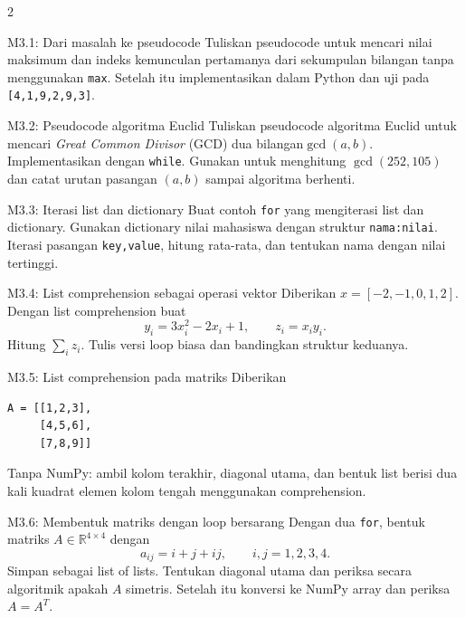 \documentclass[9pt,a4paper]{article}
\begin{document}
\begin{multicols}{2}
\begin{qbox}[L1]{M3.1: Dari masalah ke pseudocode}
Tuliskan pseudocode untuk mencari nilai maksimum dan indeks kemunculan pertamanya dari sekumpulan bilangan tanpa menggunakan \texttt{max}. Setelah itu implementasikan dalam Python dan uji pada \texttt{[4,1,9,2,9,3]}.
\end{qbox}

\begin{qbox}[L2]{M3.2: Pseudocode algoritma Euclid}
Tuliskan pseudocode algoritma Euclid untuk mencari \textit{Great Common Divisor} (GCD) dua bilangan$\gcd(a,b)$. Implementasikan dengan \texttt{while}. Gunakan untuk menghitung $\gcd(252,105)$ dan catat urutan pasangan $(a,b)$ sampai algoritma berhenti.
\end{qbox}

\begin{qbox}[L2]{M3.3: Iterasi list dan dictionary}
Buat contoh \texttt{for} yang mengiterasi list dan dictionary. Gunakan dictionary nilai mahasiswa dengan struktur \texttt{nama:nilai}. Iterasi pasangan \texttt{key,value}, hitung rata-rata, dan tentukan nama dengan nilai tertinggi.
\end{qbox}

\begin{qbox}[L2]{M3.4: List comprehension sebagai operasi vektor}
Diberikan $x=[-2,-1,0,1,2]$. Dengan list comprehension buat
\[
y_i=3x_i^2-2x_i+1,\qquad z_i=x_i y_i.
\]
Hitung $\sum_i z_i$. Tulis versi loop biasa dan bandingkan struktur keduanya.
\end{qbox}

\begin{qbox}[L3]{M3.5: List comprehension pada matriks}
Diberikan
\begin{lstlisting}
A = [[1,2,3],
     [4,5,6],
     [7,8,9]]
\end{lstlisting}
Tanpa NumPy: ambil kolom terakhir, diagonal utama, dan bentuk list berisi dua kali kuadrat elemen kolom tengah menggunakan comprehension.
\end{qbox}

\begin{qbox}[L3]{M3.6: Membentuk matriks dengan loop bersarang}
Dengan dua \texttt{for}, bentuk matriks $A\in\mathbb{R}^{4\times4}$ dengan
\[
a_{ij}=i+j+ij,\qquad i,j=1,2,3,4.
\]
Simpan sebagai list of lists. Tentukan diagonal utama dan periksa secara algoritmik apakah $A$ simetris. Setelah itu konversi ke NumPy array dan periksa $A=A^T$.
\end{qbox}


\end{multicols}
\end{document}
